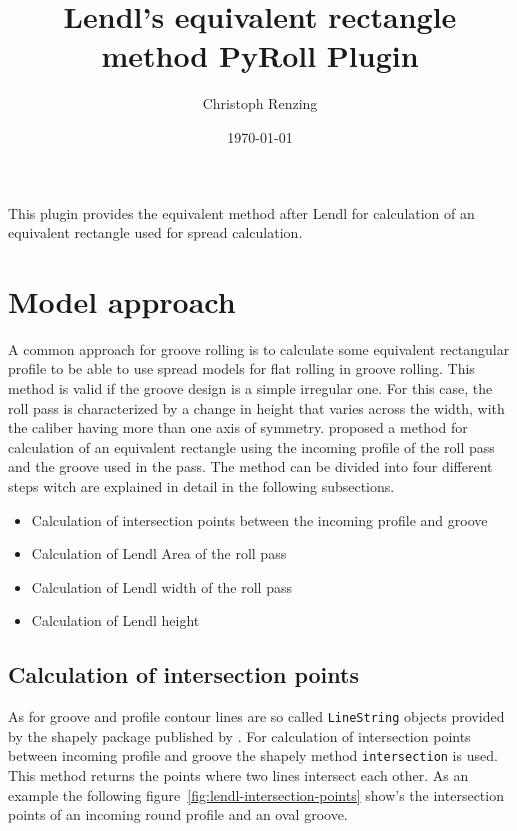 \documentclass[11pt]{PyRollDocs}
\begin{document}
    \title{Lendl's equivalent rectangle method PyRoll Plugin}
    \author{Christoph Renzing}
    \date{\today}

    \maketitle

    This plugin provides the equivalent method after Lendl for calculation of an equivalent rectangle used for spread calculation.


    \section{Model approach}\label{sec:model-approach}

    A common approach for groove rolling is to calculate some equivalent rectangular profile to be able to use spread models for flat rolling in groove rolling.
    This method is valid if the groove design is a simple irregular one.
    For this case, the roll pass is characterized by a change in height that varies across the width, with the caliber having more than one axis of symmetry.
    \textcite{Lendl_1948a, Lendl_1948b, Lendl_1949} proposed a method for calculation of an equivalent rectangle using the incoming profile of the roll pass and the groove used in the pass.
    The method can be divided into four different steps witch are explained in detail in the following subsections.

    \begin{itemize}
        \item Calculation of intersection points between the incoming profile and groove
        \item Calculation of Lendl Area of the roll pass
        \item Calculation of Lendl width of the roll pass
        \item Calculation of Lendl height
    \end{itemize}

    \subsection{Calculation of intersection points}\label{subsec:intersection-points}
    As for groove and profile contour lines are so called \texttt{LineString} objects provided by the shapely package published by \textcite{shapely2007}.
    For calculation of intersection points between incoming profile and groove the shapely method \texttt{intersection} is used.
    This method returns the points where two lines intersect each other.
    As an example the following figure~\ref{fig:lendl-intersection-points} show's the intersection points of an incoming round profile and an oval groove.
\end{document}

